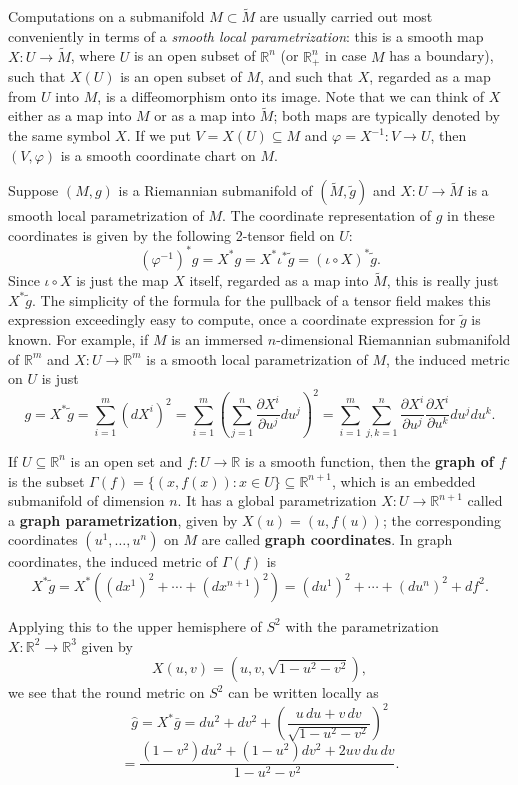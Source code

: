 Computations on a submanifold $M \subset \widetilde{M}$ are usually carried out most conveniently in terms of a \emph{smooth local parametrization}: this is a smooth map $X : U \to \widetilde{M}$, where $U$ is an open subset of $\mathbb{R}^n$ (or $\mathbb{R}^n_+$ in case $M$ has a boundary), such that $X(U)$ is an open subset of $M$, and such that $X$, regarded as a map from $U$ into $M$, is a diffeomorphism onto its image. Note that we can think of $X$ either as a map into $M$ or as a map into $\widetilde{M}$; both maps are typically denoted by the same symbol $X$. If we put $V = X(U) \subseteq M$ and $\varphi = X^{-1} : V \to U$, then $(V, \varphi)$ is a smooth coordinate chart on $M$.

Suppose $(M, g)$ is a Riemannian submanifold of $(\widetilde{M}, \widetilde{g})$ and $X : U \to \widetilde{M}$ is a smooth local parametrization of $M$. The coordinate representation of $g$ in these coordinates is given by the following 2-tensor field on $U$:
\[
(\varphi^{-1})^* g = X^* g = X^* \iota^* \widetilde{g} = (\iota \circ X)^* \widetilde{g}.
\]
Since $\iota \circ X$ is just the map $X$ itself, regarded as a map into $\tilde{M}$, this is really just $X^*\tilde{g}$. The simplicity of the formula for the pullback of a tensor field makes this expression exceedingly easy to compute, once a coordinate expression for $\tilde{g}$ is known. For example, if $M$ is an immersed $n$-dimensional Riemannian submanifold of $\mathbb{R}^m$ and $X : U \to \mathbb{R}^m$ is a smooth local parametrization of $M$, the induced metric on $U$ is just
\[
g = X^*\tilde{g} = \sum_{i=1}^m (dX^i)^2 = \sum_{i=1}^m \left(\sum_{j=1}^n \frac{\partial X^i}{\partial u^j} du^j\right)^2 = \sum_{i=1}^m \sum_{j,k=1}^n \frac{\partial X^i}{\partial u^j}\frac{\partial X^i}{\partial u^k} du^j du^k.
\]

\begin{example}
\label{ex:metrics-in-graph-coordinates}
\leanok
{}

If $U \subseteq \mathbb{R}^n$ is an open set and $f : U \to \mathbb{R}$ is a smooth function, then the \textbf{graph of $f$} is the subset $\Gamma(f) = \{(x, f(x)) : x \in U\} \subseteq \mathbb{R}^{n+1}$, which is an embedded submanifold of dimension $n$. It has a global parametrization $X : U \to \mathbb{R}^{n+1}$ called a \textbf{graph parametrization}, given by $X(u) = (u, f(u))$; the corresponding coordinates $(u^1,\ldots,u^n)$ on $M$ are called \textbf{graph coordinates}. In graph coordinates, the induced metric of $\Gamma(f)$ is
\[
X^*\tilde{g} = X^*\left((dx^1)^2 + \cdots + (dx^{n+1})^2\right) = (du^1)^2 + \cdots + (du^n)^2 + df^2.
\]

Applying this to the upper hemisphere of $S^2$ with the parametrization $X : \mathbb{R}^2 \to \mathbb{R}^3$ given by
\[
X(u,v) = \left(u, v, \sqrt{1-u^2-v^2}\right),
\]
we see that the round metric on $S^2$ can be written locally as
\[
\hat{g} = X^*\bar{g} = du^2 + dv^2 + \left(\frac{u\,du + v\,dv}{\sqrt{1-u^2-v^2}}\right)^2
\]
\[
= \frac{(1-v^2) du^2 + (1-u^2) dv^2 + 2uv\,du\,dv}{1-u^2-v^2}.
\]
\end{example}


